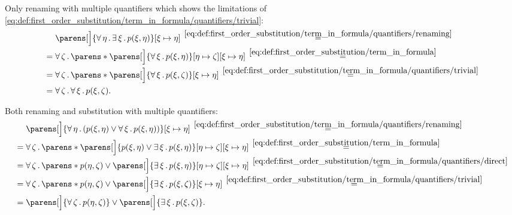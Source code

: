 \begin{example}
\begin{thmenum}
     Only renaming with multiple quantifiers which shows the limitations of \eqref{eq:def:first_order_substitution/term_in_formula/quantifiers/trivial}:
    \begin{align*}
      &\phantom{{}={}}
      \parens[\Big]{\qforall \eta \qexists \xi p(\xi, \eta)}[\xi \mapsto \eta]
      \reloset {\eqref{eq:def:first_order_substitution/term_in_formula/quantifiers/renaming}} = \\ &=
      \qforall \zeta \parens*{ \parens[\Big]{ \qforall \xi p(\xi, \eta) }[\eta \mapsto \zeta][\xi \mapsto \eta]}
      \reloset {\eqref{eq:def:first_order_substitution/term_in_formula}} = \\ &=
      \qforall \zeta \parens*{ \parens[\Big]{ \qforall \xi p(\xi, \zeta) }[\xi \mapsto \eta]}
      \reloset {\eqref{eq:def:first_order_substitution/term_in_formula/quantifiers/trivial}} = \\ &=
      \qforall \zeta \qforall \xi p(\xi, \zeta).
    \end{align*}

     Both renaming and substitution with multiple quantifiers:
    \begin{align*}
      &\phantom{{}={}}
      \parens[\Big]{ \qforall \eta (p(\xi, \eta) \vee \qforall \xi p(\xi, \eta)) }[\xi \mapsto \eta]
      \reloset {\eqref{eq:def:first_order_substitution/term_in_formula/quantifiers/renaming}} = \\ &=
      \qforall \zeta \parens*{ \parens[\Big]{ p(\xi, \eta) \vee \qexists \xi p(\xi, \eta) }[\eta \mapsto \zeta][\xi \mapsto \eta] }
      \reloset {\eqref{eq:def:first_order_substitution/term_in_formula}} = \\ &=
      \qforall \zeta \parens*{ p(\eta, \zeta) \vee \parens[\Big]{ \qexists \xi p(\xi, \eta) }[\eta \mapsto \zeta][\xi \mapsto \eta] }
      \reloset {\eqref{eq:def:first_order_substitution/term_in_formula/quantifiers/direct}} = \\ &=
      \qforall \zeta \parens*{ p(\eta, \zeta) \vee \parens[\Big]{ \qexists \xi p(\xi, \zeta) }[\xi \mapsto \eta] }
      \reloset {\eqref{eq:def:first_order_substitution/term_in_formula/quantifiers/trivial}} = \\ &=
      \parens[\Big]{ \qforall \zeta p(\eta, \zeta) } \vee \parens[\Big]{ \qexists \xi p(\xi, \zeta) }.
    \end{align*}


\end{thmenum}
\end{example}
